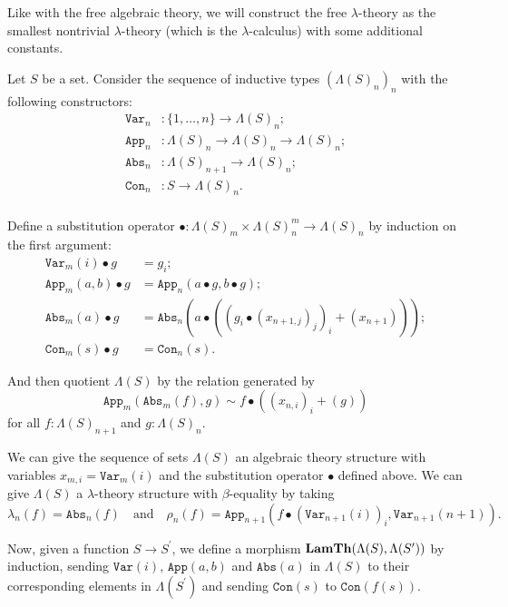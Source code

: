 Like with the free algebraic theory, we will construct the free $ \lambda $-theory as the smallest nontrivial $ \lambda $-theory (which is the $ \lambda $-calculus) with some additional constants.

Let $ S $ be a set. Consider the sequence of inductive types $ (\Lambda(S)_n)_n $ with the following constructors:
\begin{align*}
  \mathtt{Var}_n &: \{ 1, \dots, n \} \to \Lambda(S)_n;\\
  \mathtt{App}_n &: \Lambda(S)_n \to \Lambda(S)_n \to \Lambda(S)_n;\\
  \mathtt{Abs}_n &: \Lambda(S)_{n + 1} \to \Lambda(S)_n;\\
  \mathtt{Con}_n &: S \to \Lambda(S)_n.\\
\end{align*}

Define a substitution operator $ \bullet: \Lambda(S)_m \times \Lambda(S)_n^m \to \Lambda(S)_n $ by induction on the first argument:
\begin{align*}
  \mathtt{Var}_m(i) \bullet g &= g_i;\\
  \mathtt{App}_m(a, b) \bullet g &= \mathtt{App}_n(a \bullet g, b \bullet g);\\
  \mathtt{Abs}_m(a) \bullet g &= \mathtt{Abs}_n(a \bullet ((g_i \bullet (x_{n + 1, j})_j)_i + (x_{n + 1})));\\
  \mathtt{Con}_m(s) \bullet g &= \mathtt{Con}_n(s).
\end{align*}

And then quotient $ \Lambda(S) $ by the relation generated by
\[ \mathtt{App}_m(\mathtt{Abs}_m(f), g) \sim f \bullet ((x_{n, i})_i + (g)) \]
for all $ f: \Lambda(S)_{n + 1} $ and $ g: \Lambda(S)_n $.

\begin{example}
  We can give the sequence of sets $ \Lambda(S) $ an algebraic theory structure with variables $ x_{m, i} = \mathtt{Var}_m(i) $ and the substitution operator $ \bullet $ defined above. We can give $ \Lambda(S) $ a $ \lambda $-theory structure with $ \beta $-equality by taking
  \[ \lambda_n(f) = \mathtt{Abs}_n(f) \quad \text{and} \quad \rho_n(f) = \mathtt{App}_{n + 1}(f \bullet (\mathtt{Var}_{n + 1}(i))_i, \mathtt{Var}_{n + 1}(n + 1)). \]

  Now, given a function $ S \to S^\prime $, we define a morphism $ \mathbf{LamTh}(\Lambda(S), \Lambda(S^\prime)) $ by induction, sending $ \mathtt{Var}(i) $, $ \mathtt{App}(a, b) $ and $ \mathtt{Abs}(a) $ in $ \Lambda(S) $ to their corresponding elements in $ \Lambda(S^\prime) $ and sending $ \mathtt{Con}(s) $ to $ \mathtt{Con}(f(s)) $.
\end{example}

